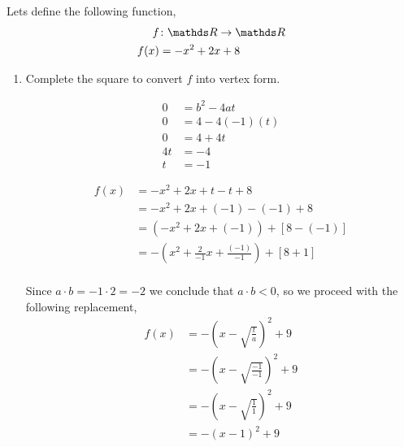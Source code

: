 \documentclass[12pt]{article} %
\begin{document}
\begin{qstn}[4]
  Lets define the following function,
  \begin{align*}
    f &\colon \R \to \R\\
    f(x) &= -x^2 + 2x + 8
  \end{align*}

 \begin{enumerate}[label=(\alph*)]
      \item Complete the square to convert $f$ into vertex form.
        \begin{solution}
          \begin{step}
            \begin{align*}
               0 &= b^2 - 4at\\
               0 &= 4 - 4(-1)(t)\\
               0 &= 4 + 4t\\
               4t &= -4\\
               t &= -1
            \end{align*}
          \end{step}

          \vspace*{-1cm}

          \begin{step}
            \begin{align*}
              f(x) &= -x^2 + 2x + t -t + 8\\
                   &= -x^2 + 2x + (-1) - (-1) + 8\\
                   &= \left( -x^2 + 2x + (-1) \right) + \left[ 8 - (-1) \right]\\
                   &= -\left( x^2 +\frac{2}{-1}x + \frac{(-1)}{-1} \right) + \left[ 8 + 1 \right] \\
            \end{align*}
          \end{step}

          \vspace*{-1cm}

          \begin{step}
            Since $a \cdot b = -1 \cdot 2 = -2$ we conclude that $a \cdot b < 0$, so we proceed with the following replacement,
            \begin{align*}
              f(x) &= -\left( x - \sqrt{\frac{t}{a}}\right)^2 + 9\\
                   &= -\left( x - \sqrt{\frac{-1}{-1}}  \right)^2 + 9\\
                   &= -\left( x - \sqrt{\frac{1}{1}}  \right)^2 + 9\\
                   &= -\left( x - 1 \right)^2  +9
            \end{align*}
          \end{step}


\end{solution}
\end{enumerate}
\end{qstn}
\end{document}
